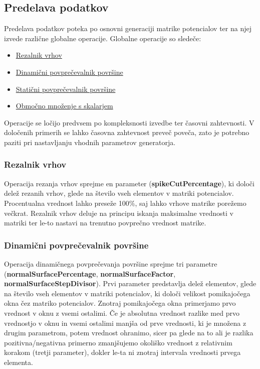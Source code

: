 \documentclass[a4paper,twoside,openright,12pt,slovene]{book}
\begin{document}
\subsection{Predelava podatkov}
\label{predelavaPodatkov}

Predelava podatkov poteka po osnovni generaciji matrike potencialov ter na njej izvede različne globalne operacije. Globalne operacije so sledeče:

\begin{itemize}
    \setlength\itemsep{0.1em}
    \item \hyperref[rezalnikVrhov]{Rezalnik vrhov}
    \item \hyperref[dinamičniPovprečevalnik]{Dinamični povprečevalnik površine}
    \item \hyperref[statičniPovprečevalnik]{Statični povprečevalnik površine}
    \item \hyperref[območnoMnoženje]{Območno množenje s skalarjem}
\end{itemize}

Operacije se ločijo predvsem po kompleksnosti izvedbe ter časovni zahtevnosti. V določenih primerih se lahko časovna zahtevnost preveč poveča, zato je potrebno paziti pri nastavljanju vhodnih parametrov generatorja. 


\subsubsection{Rezalnik vrhov}
\label{rezalnikVrhov}

Operacija rezanja vrhov sprejme en parameter (\textbf{spikeCutPercentage}), ki določi delež rezanih vrhov, glede na število vseh elementov v matriki potencialov. Procentualna vrednost lahko preseže 100\%, saj lahko vrhove matrike porežemo večkrat. Rezalnik vrhov deluje na principu iskanja maksimalne vrednosti v matriki ter le-to nastavi na trenutno povprečno vrednost matrike.


\subsubsection{Dinamični povprečevalnik površine}
\label{dinamičniPovprečevalnik}

Operacija dinamičnega povprečevanja površine sprejme tri parametre (\textbf{normalSurfacePercentage}, \textbf{normalSurfaceFactor}, \textbf{normalSurfaceStepDivisor}). Prvi parameter predstavlja delež elementov, glede na število vseh elementov v matriki potencialov, ki določi velikost pomikajočega okna čez matriko potencialov. Znotraj pomikajočega okna primerjamo prvo vrednost v oknu z vsemi ostalimi. Če je absolutna vrednost razlike med prvo vrednostjo v oknu in vsemi ostalimi manjša od prve vrednosti, ki je množena z drugim parametrom, potem vrednost ohranimo, sicer pa glede na to ali je razlika pozitivna/negativna primerno zmanjšujemo okoliško vrednost z relativnim korakom (tretji parameter), dokler le-ta ni znotraj intervala vrednosti prvega elementa.
\end{document}
